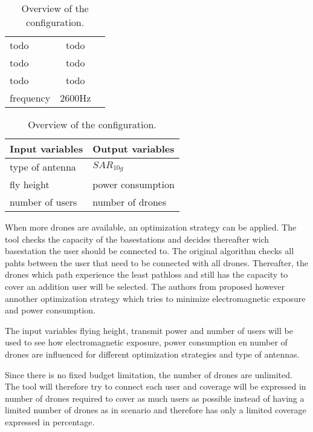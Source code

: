 \begin{table}[!htb]
    \begin{minipage}{.5\linewidth}
      \centering
        \begin{tabular}{|l|c|l|}
        \hline
        todo               & todo        \\    
        todo               & todo\\ 
        todo               & todo                     \\ 
        frequency                      & 2600Hz                   \\ 
        \hline
        \end{tabular}
    \end{minipage}%
    \begin{minipage}{.5\linewidth}
      \centering
            \begin{tabular}{|l|l|}
            \hline
            Input variables                & Output variables          \\   \hline 
            type of antenna                & $SAR_{10g}$               \\ 
            fly height                     & power consumption             \\ 
            number of users                & number of drones            \\ 
            \hline
            \end{tabular}
    \end{minipage} 
        \caption{Overview of the configuration.}
        \label{table:confOverviewScenario2}
\end{table}


When more drones are available, an optimization strategy can be applied. The tool checks the capacity of the basestations and decides thereafter
wich basestation the user should be connected to. The original algorithm checks all pahts between the user that need to be connected with 
all drones. Thereafter, the drones which path experience the least pathloss and still has the capacity to cover an addition user will be selected.
The authors from \cite{J1} proposed however annother optimization strategy which tries to minimize electromagnetic exposure and 
power consumption.

The input variables flying height, transmit power and number of users will be used to see how electromagnetic exposure, power consumption en number of drones are influenced for
different optimization strategies and type of antennas.

Since there is no fixed budget limitation, the number of drones are unlimited. The tool will therefore try to connect each user and
coverage will be expressed in number of drones required to cover as much users as possible instead of having a limited number of drones  
as in scenario and therefore has only a limited coverage expressed in percentage.